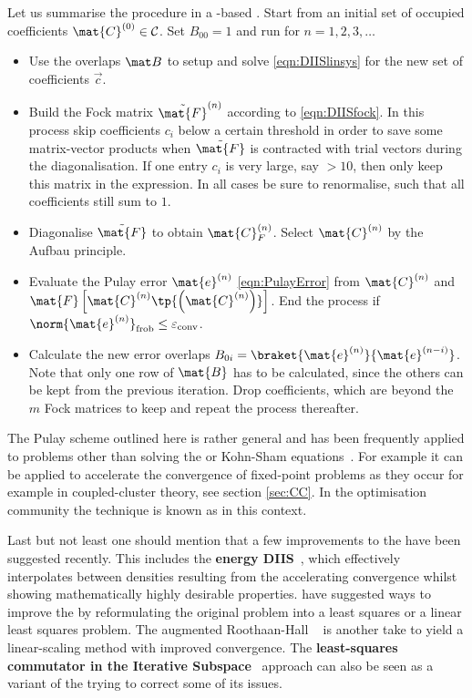Let us summarise the procedure in a \contraction-based \SCF.
Start from an initial set of occupied coefficients $\mat{C}^{(0)} \in \mathcal{C}$.
Set $B_{00} = 1$ and run for $n=1, 2, 3, \ldots$
\begin{itemize}
	\item Use the overlaps $\mat B$ to setup and solve \eqref{eqn:DIISlinsys}
		for the new set of \DIIS coefficients $\vec{c}$.
	\item Build the Fock matrix $\tilde{\mat{F}}^{(n)}$
		according to \eqref{eqn:DIISfock}.
		In this process skip coefficients $c_i$ below a certain threshold
		in order to save some matrix-vector products when
		$\tilde{\mat{F}}$ is contracted with trial vectors during
		the diagonalisation.
		If one entry $c_i$ is very large, say $>10$,
		then only keep this matrix in the expression.
		In all cases be sure to renormalise,
		such that all coefficients still sum to $1$.
	\item Diagonalise $\tilde{\mat{F}}$
		to obtain $\mat{C}_F^{(n)}$.
		Select $\mat{C}^{(n)}$ by the Aufbau principle.
	\item Evaluate the Pulay error $\mat{e}^{(n)}$ \eqref{eqn:PulayError}
		from $\mat{C}^{(n)}$ and
		$\mat{F}\left[\mat{C}^{(n)} \tp{\left(\mat{C}^{(n)}\right)} \right]$.
		End the process if $\norm{\mat{e}^{(n)}}_\text{frob} \leq \epsilonconv$.
	\item Calculate the new error overlaps
		$B_{0i} = \braket{\mat{e}^{(n)}}{\mat{e}^{(n-i)}}$.
		Note that only one row of $\mat{B}$ has to be calculated,
		since the others can be kept from the previous \SCF iteration.
		Drop coefficients, which are beyond the $m$ Fock matrices to keep
		and repeat the process thereafter.
\end{itemize}
The Pulay \DIIS scheme outlined here is rather general
and has been frequently applied to problems
other than solving the \HF or Kohn-Sham equations~\cite{Hamilton1986}.
For example it can be applied to accelerate
the convergence of fixed-point problems
as they occur for example in coupled-cluster theory,
see section \vref{sec:CC}.
In the optimisation community the \DIIS technique is known as
\cite{Anderson1965} in this context.

Last but not least one should mention that a few
improvements to the \DIIS have been suggested recently.
This includes the \textbf{energy DIIS}~\cite{Kudin2002},
which effectively interpolates between densities resulting
from the \ODA accelerating \ODA convergence
whilst showing mathematically highly desirable properties.
\citet{Shepard2007} have suggested ways to improve the \DIIS
by reformulating the original problem into a least squares
or a linear least squares problem.
The augmented Roothaan-Hall \DIIS~\cite{Hoest2008} is another take
to yield a linear-scaling method with improved convergence.
The
\textbf{least-squares commutator in the Iterative Subspace}~\cite{Li2016} approach
can also be seen as a variant of the \DIIS
trying to correct some of its issues.

